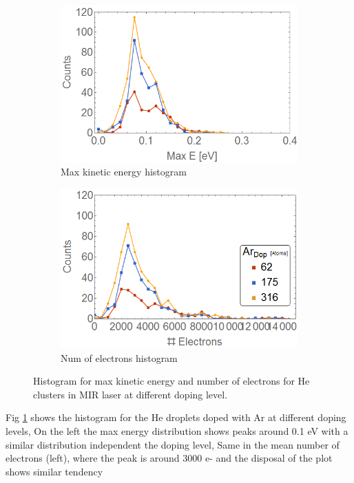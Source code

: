 \begin{figure}[h!]
\centering
\begin{subfigure}[l]{0.49\textwidth}\caption{Max kinetic energy histogram}
\includegraphics[width=1\textwidth]{../Images/results/MIR_He_ArDop/Henerg2.png} 
\end{subfigure}
\begin{subfigure}[l]{0.49\textwidth}\caption{Num of electrons histogram}
\includegraphics[width=1\textwidth]{../Images/results/MIR_He_ArDop/Helec.png}   				\end{subfigure}
\caption[MIR He-Ar. Histograms]{Histogram for max kinetic energy and number of electrons for He clusters in MIR laser at different doping level.}
\label{fig:histoArdop}
\end{figure}

Fig \ref{fig:histoArdop} shows the histogram for the He droplets doped with Ar at different doping levels, On the left the max energy distribution shows peaks around 0.1 eV with a similar distribution independent the doping level, Same in the mean number of electrons (left), where the peak is around 3000 e- and the disposal of the plot shows similar tendency

